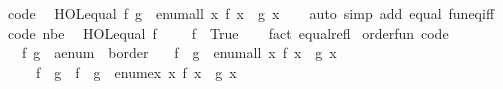 \begin{isabellebody}
\endisatagproof
{\isafoldproof}%
%
\isadelimproof
%
\endisadelimproof
\isanewline
\isanewline
{}\isamarkupfalse%
\isanewline
\isanewline
{}\isamarkupfalse%
\ {\isacharbrackleft}{\kern0pt}code{\isacharbrackright}{\kern0pt}{\isacharcolon}{\kern0pt}\isanewline
\ \ {\isachardoublequoteopen}HOL{\isachardot}{\kern0pt}equal\ f\ g\ {\isasymlongleftrightarrow}\ enum{\isacharunderscore}{\kern0pt}all\ {\isacharparenleft}{\kern0pt}{\isacharpercent}{\kern0pt}x{\isachardot}{\kern0pt}\ f\ x\ {\isacharequal}{\kern0pt}\ g\ x{\isacharparenright}{\kern0pt}{\isachardoublequoteclose}\isanewline
%
\isadelimproof
\ \ %
\endisadelimproof
%
\isatagproof
{}\isamarkupfalse%
\ {\isacharparenleft}{\kern0pt}auto\ simp\ add{\isacharcolon}{\kern0pt}\ equal\ fun{\isacharunderscore}{\kern0pt}eq{\isacharunderscore}{\kern0pt}iff{\isacharparenright}{\kern0pt}%
\endisatagproof
{\isafoldproof}%
%
\isadelimproof
\isanewline
%
\endisadelimproof
\isanewline
{}\isamarkupfalse%
\ {\isacharbrackleft}{\kern0pt}code\ nbe{\isacharbrackright}{\kern0pt}{\isacharcolon}{\kern0pt}\isanewline
\ \ {\isachardoublequoteopen}HOL{\isachardot}{\kern0pt}equal\ {\isacharparenleft}{\kern0pt}f\ {\isacharcolon}{\kern0pt}{\isacharcolon}{\kern0pt}\ {\isacharunderscore}{\kern0pt}\ {\isasymRightarrow}\ {\isacharunderscore}{\kern0pt}{\isacharparenright}{\kern0pt}\ f\ {\isasymlongleftrightarrow}\ True{\isachardoublequoteclose}\isanewline
%
\isadelimproof
\ \ %
\endisadelimproof
%
\isatagproof
{}\isamarkupfalse%
\ {\isacharparenleft}{\kern0pt}fact\ equal{\isacharunderscore}{\kern0pt}refl{\isacharparenright}{\kern0pt}%
\endisatagproof
{\isafoldproof}%
%
\isadelimproof
\isanewline
%
\endisadelimproof
\isanewline
{}\isamarkupfalse%
\ order{\isacharunderscore}{\kern0pt}fun\ {\isacharbrackleft}{\kern0pt}code{\isacharbrackright}{\kern0pt}{\isacharcolon}{\kern0pt}\isanewline
\ \ \ f\ g\ {\isacharcolon}{\kern0pt}{\isacharcolon}{\kern0pt}\ {\isachardoublequoteopen}{\isacharprime}{\kern0pt}a{\isacharcolon}{\kern0pt}{\isacharcolon}{\kern0pt}enum\ {\isasymRightarrow}\ {\isacharprime}{\kern0pt}b{\isacharcolon}{\kern0pt}{\isacharcolon}{\kern0pt}order{\isachardoublequoteclose}\isanewline
\ \ \ {\isachardoublequoteopen}f\ {\isasymle}\ g\ {\isasymlongleftrightarrow}\ enum{\isacharunderscore}{\kern0pt}all\ {\isacharparenleft}{\kern0pt}{\isasymlambda}x{\isachardot}{\kern0pt}\ f\ x\ {\isasymle}\ g\ x{\isacharparenright}{\kern0pt}{\isachardoublequoteclose}\isanewline
\ \ \ \ \ {\isachardoublequoteopen}f\ {\isacharless}{\kern0pt}\ g\ {\isasymlongleftrightarrow}\ f\ {\isasymle}\ g\ {\isasymand}\ enum{\isacharunderscore}{\kern0pt}ex\ {\isacharparenleft}{\kern0pt}{\isasymlambda}x{\isachardot}{\kern0pt}\ f\ x\ {\isasymnoteq}\ g\ x{\isacharparenright}{\kern0pt}{\isachardoublequoteclose}\isanewline

\end{isabellebody}
